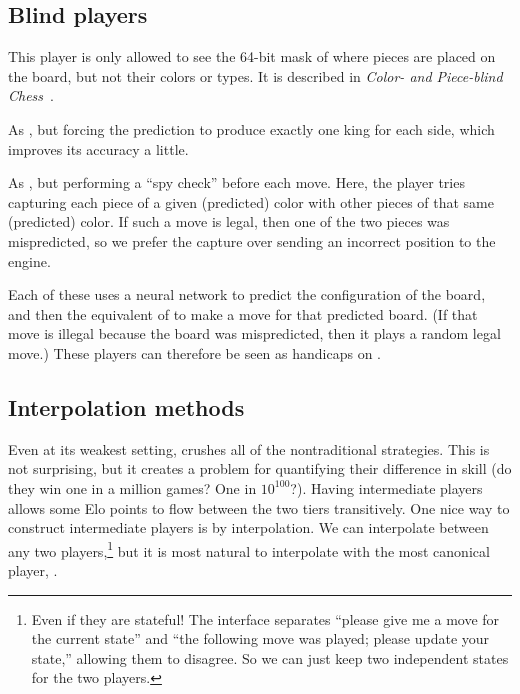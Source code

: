 \documentclass[10pt,preprint,twocolumn]{acmart}
\begin{document}
\subsection{Blind players}

 This player is only allowed to see the
64-bit mask of where pieces are placed on the board, but not their
colors or types. It is described in {\it Color- and Piece-blind
  Chess}~\cite{blind}.

 As , but forcing
the prediction to produce exactly one king for each side, which
improves its accuracy a little.

 As , but
performing a ``spy check'' before each move. Here, the player tries
capturing each piece of a given (predicted) color with other pieces
of that same (predicted) color. If such a move is legal, then one
of the two pieces was mispredicted, so we prefer the capture over
sending an incorrect position to the engine.

Each of these uses a neural network to predict the configuration of
the board, and then the equivalent of  to make a
move for that predicted board. (If that move is illegal because the
board was mispredicted, then it plays a random legal move.) These
players can therefore be seen as handicaps on .

\subsection{Interpolation methods}

Even at its weakest setting,  crushes all of the
nontraditional strategies. This is not surprising, but it creates a
problem for quantifying their difference in skill (do they win one in
a million games? One in $10^{100}$?). Having intermediate players
allows some Elo points to flow between the two tiers transitively. One
nice way to construct intermediate players is by interpolation. We can
interpolate between any two players,\footnote{ Even if they are
  stateful! The interface separates ``please give me a move for the
  current state'' and ``the following move was played; please update
  your state,'' allowing them to disagree. So we can just keep two
  independent states for the two players.} but it is most natural to
interpolate with the most canonical player, .
\end{document}
